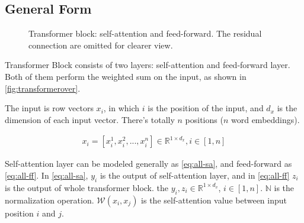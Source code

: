 \documentclass[final]{cvpr}
\begin{document}
\subsection{General Form}
\label{sec:general}
\begin{figure}[ht]
\begin{center}
\end{center}
   \caption{Transformer block: self-attention and feed-forward. The residual connection are omitted for clearer view.
   }
\label{fig:transformerover}
\end{figure}

Transformer Block consists of two layers: self-attention and feed-forward layer. Both of them perform the weighted sum on the input, as shown in \autoref{fig:transformerover}.

The input is row vectors $x_i$, in which $i$ is the position of the input, and $d_x$ is the dimension of each input vector. There's totally $n$ positions ($n$ word embeddings).

\begin{align*}
    x_i=[x_i^1, x_i^2, ..., x_i^n]\in\mathbb{R}^{1\times{d_x}}, i\in[1,n]
\end{align*}

Self-attention layer can be modeled generally as \autoref{eq:all-sa}, and feed-forward as \autoref{eq:all-ff}. In \autoref{eq:all-sa}, $y_i$ is the output of self-attention layer, and in \autoref{eq:all-ff} $z_i$ is the output of whole transformer block. the $y_i, z_i\in\mathbb{R}^{1\times{d_v}}$, $i\in[1,n]$. $\mathbb{N}$ is the normalization operation. $\mathcal{W}(x_i,x_j)$ is the self-attention value between input position $i$ and $j$. 
\end{document}
